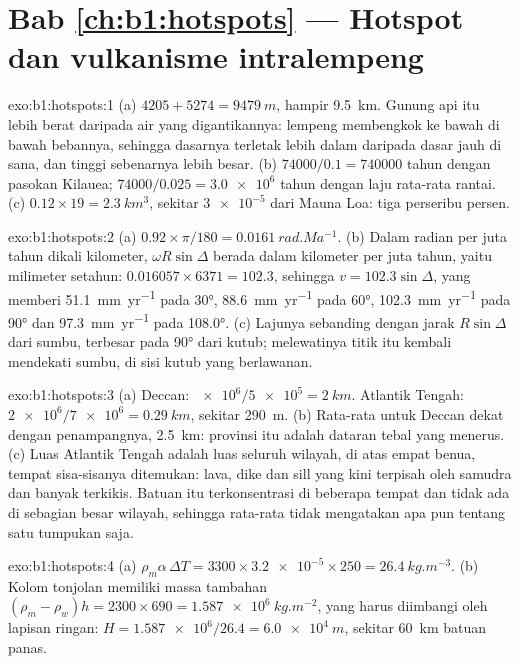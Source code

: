 \section*{Bab \ref{ch:b1:hotspots} --- Hotspot dan vulkanisme intralempeng}

\begin{solution}{exo:b1:hotspots:1}
(a) $4205 + 5274 = \qty{9479}{m}$, hampir \qty{9.5}{km}. Gunung api itu lebih berat daripada air yang digantikannya: lempeng membengkok ke bawah di bawah bebannya, sehingga dasarnya terletak lebih dalam daripada dasar jauh di sana, dan tinggi sebenarnya lebih besar. (b) $74000/0.1 = \num{740000}$ tahun dengan pasokan Kilauea; $74000/0.025 = \num{3.0e6}$ tahun dengan laju rata-rata rantai. (c) $0.12\times19 = \qty{2.3}{km^3}$, sekitar $\num{3e-5}$ dari Mauna Loa: tiga perseribu persen.
\end{solution}

\begin{solution}{exo:b1:hotspots:2}
(a) $0.92\times\pi/180 = \qty{0.0161}{rad.Ma^{-1}}$. (b) Dalam radian per juta tahun dikali kilometer, $\omega R\sin\Delta$ berada dalam kilometer per juta tahun, yaitu milimeter setahun: $0.016057\times6371 = 102.3$, sehingga $v = 102.3\sin\Delta$, yang memberi \qty{51.1}{mm.yr^{-1}} pada \ang{30}, \qty{88.6}{mm.yr^{-1}} pada \ang{60}, \qty{102.3}{mm.yr^{-1}} pada \ang{90} dan \qty{97.3}{mm.yr^{-1}} pada \ang{108.0}. (c) Lajunya sebanding dengan jarak $R\sin\Delta$ dari sumbu, terbesar pada  \ang{90} dari kutub; melewatinya titik itu kembali mendekati sumbu, di sisi kutub yang berlawanan.
\end{solution}

\begin{solution}{exo:b1:hotspots:3}
(a) Deccan: $\num{e6}/\num{5e5} = \qty{2}{km}$. Atlantik Tengah: $\num{2e6}/\num{7e6} = \qty{0.29}{km}$, sekitar \qty{290}{m}. (b) Rata-rata untuk Deccan dekat dengan penampangnya, \qty{2.5}{km}: provinsi itu adalah dataran tebal yang menerus. (c) Luas Atlantik Tengah adalah luas seluruh wilayah, di atas empat benua, tempat sisa-sisanya ditemukan: lava, dike dan sill yang kini terpisah oleh samudra dan banyak terkikis. Batuan itu terkonsentrasi di beberapa tempat dan tidak ada di sebagian besar wilayah, sehingga rata-rata tidak mengatakan apa pun tentang satu tumpukan saja.
\end{solution}

\begin{solution}{exo:b1:hotspots:4}
(a) $\rho_m\alpha\,\Delta T = 3300\times\num{3.2e-5}\times250 =
\qty{26.4}{kg.m^{-3}}$. (b) Kolom tonjolan memiliki massa tambahan $(\rho_m - \rho_w)h = 2300\times690 = \qty{1.587e6}{kg.m^{-2}}$, yang harus diimbangi oleh lapisan ringan: $H = \num{1.587e6}/26.4 = \qty{6.0e4}{m}$, sekitar \qty{60}{km} batuan panas.
\end{solution}

